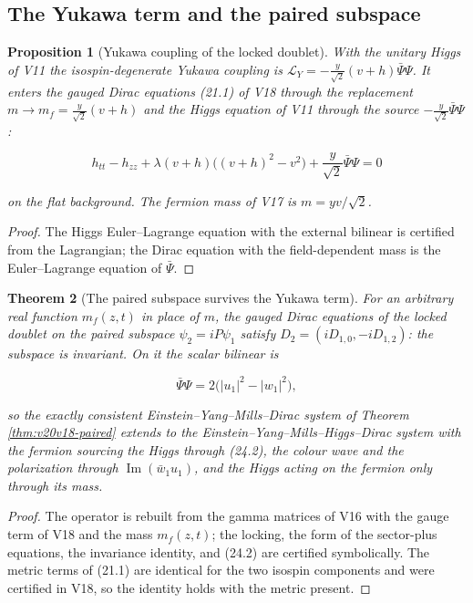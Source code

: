\documentclass[11pt]{article}
\newtheorem{theorem}{Theorem}[section]
\newtheorem{proposition}[theorem]{Proposition}
\theoremstyle{remark}
\begin{document}
\subsection{The Yukawa term and the paired subspace}

\begin{proposition}[Yukawa coupling of the locked doublet]
\label{prop:v20v21-yukawa}
With the unitary Higgs of V11 the isospin-degenerate Yukawa coupling is
\(\mathcal L_Y=-\tfrac{y}{\sqrt2}(v+h)\bar\Psi\Psi\).  It enters the
gauged Dirac equations (21.1) of V18 through the replacement
\(m\to m_f=\tfrac{y}{\sqrt2}(v+h)\) and the Higgs equation of V11
through the source \(-\tfrac y{\sqrt2}\bar\Psi\Psi\):

\[
 h_{tt}-h_{zz}+\lambda(v+h)\bigl((v+h)^2-v^2\bigr)+\frac y{\sqrt2}\bar\Psi\Psi=0
                                                                    \tag{24.1}
\]

on the flat background.  The fermion mass of V17 is \(m=yv/\sqrt2\).
\end{proposition}

\begin{proof}
The Higgs Euler--Lagrange equation with the external bilinear is
certified from the Lagrangian; the Dirac equation with the
field-dependent mass is the Euler--Lagrange equation of \(\bar\Psi\).
\end{proof}

\begin{theorem}[The paired subspace survives the Yukawa term]
\label{thm:v20v21-paired}
For an arbitrary real function \(m_f(z,t)\) in place of \(m\), the
gauged Dirac equations of the locked doublet on the paired subspace
\(\psi_2=iP\psi_1\) satisfy \(D_2=(iD_{1,0},-iD_{1,2})\): the subspace
is invariant.  On it the scalar bilinear is

\[
 \bar\Psi\Psi=2\bigl(|u_1|^2-|w_1|^2\bigr),                           \tag{24.2}
\]

so the exactly consistent Einstein--Yang--Mills--Dirac system of
Theorem \ref{thm:v20v18-paired} extends to the
Einstein--Yang--Mills--Higgs--Dirac system with the fermion sourcing
the Higgs through (24.2), the colour wave and the polarization through
\(\operatorname{Im}(\bar w_1u_1)\), and the Higgs acting on the fermion
only through its mass.
\end{theorem}

\begin{proof}
The operator is rebuilt from the gamma matrices of V16 with the gauge
term of V18 and the mass \(m_f(z,t)\); the locking, the form of the
sector-plus equations, the invariance identity, and (24.2) are
certified symbolically.  The metric terms of (21.1) are identical for
the two isospin components and were certified in V18, so the identity
holds with the metric present.
\end{proof}
\end{document}
